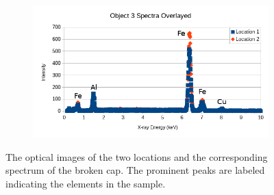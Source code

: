 \documentclass[10pt]{IEEEtran}
\begin{document}
\begin{center}
\begin{figure}[!hbt]
    ~ %
    \begin{subfigure}[!hbt]{0.41\textwidth}
        \includegraphics[width=\textwidth]{Object3}
        \label{fig:Object3}
    \end{subfigure}
    \caption{The optical images of the two locations and the corresponding spectrum of the broken cap. The prominent peaks are labeled indicating the elements in the sample.}
    \label{fig:objects3}
\end{figure}


\end{center}
\end{document}
